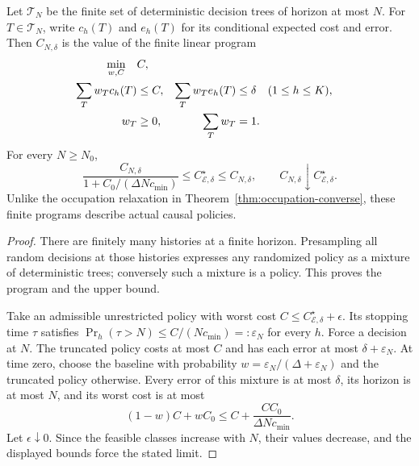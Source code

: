 \begin{theorem}
\label{thm:catalogue-exact}
Let $\mathcal T_N$ be the finite set of deterministic decision trees of
horizon at most $N$. For $T\in\mathcal T_N$, write $c_h(T)$ and $e_h(T)$
for its conditional expected cost and error. Then $C_{N,\delta}$ is the
value of the finite linear program
\begin{align}
 \min_{w,C}\quad &C,\notag\\
 \sum_Tw_Tc_h(T)&\leq C, &
 \sum_Tw_Te_h(T)&\leq\delta \quad(1\leq h\leq K),\label{eq:exact-tree-lp}\\
 w_T&\geq0, &\sum_Tw_T&=1.\notag
\end{align}
For every $N\geq N_0$,
\begin{equation}\label{eq:catalogue-matching}
 \frac{C_{N,\delta}}{1+C_0/(\Delta N c_{\min})}
 \leq C_{\mathcal E,\delta}^\star\leq C_{N,\delta},
 \qquad C_{N,\delta}\downarrow C_{\mathcal E,\delta}^\star.
\end{equation}
Unlike the occupation relaxation in Theorem~\ref{thm:occupation-converse},
these finite programs describe actual causal policies.
\end{theorem}
\begin{proof}
There are finitely many histories at a finite horizon. Presampling all
random decisions at those histories expresses any randomized policy as
a mixture of deterministic trees; conversely such a mixture is a policy.
This proves the program and the upper bound.

Take an admissible unrestricted policy with worst cost
$C\leq C_{\mathcal E,\delta}^\star+\epsilon$. Its stopping time $\tau$
satisfies $\Pr_h(\tau>N)\leq C/(Nc_{\min})=:\varepsilon_N$ for every $h$.
Force a decision at $N$. The truncated policy costs at most $C$ and has
each error at most $\delta+\varepsilon_N$.
At time zero, choose the baseline with probability
$w=\varepsilon_N/(\Delta+\varepsilon_N)$ and the truncated policy otherwise.
Every error of this mixture is at most $\delta$, its horizon is at most $N$,
and its worst cost is at most
\[
 (1-w)C+wC_0\leq C+
 \frac{CC_0}{\Delta Nc_{\min}}.
\]
Let $\epsilon\downarrow0$. Since the feasible classes increase with $N$,
their values decrease, and the displayed bounds force the stated limit.
\end{proof}

